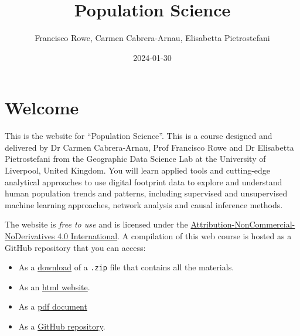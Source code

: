\documentclass[
  letterpaper,
  DIV=11,
  numbers=noendperiod]{scrreprt}
\title{Population Science}
\author{Francisco Rowe, Carmen Cabrera-Arnau, Elisabetta Pietrostefani}
\date{2024-01-30}
\providecommand{\tightlist}{%
  \setlength{\itemsep}{0pt}\setlength{\parskip}{0pt}}\usepackage{longtable,booktabs,array}
\renewcommand*\contentsname{Table of contents}
\newcommand\contentsname{Table of contents}
\begin{document}
\maketitle
\ifdefined\Shaded\renewenvironment{Shaded}{\begin{tcolorbox}[borderline west={3pt}{0pt}{shadecolor}, sharp corners, frame hidden, boxrule=0pt, enhanced, breakable, interior hidden]}{\end{tcolorbox}}\fi

\renewcommand*\contentsname{Table of contents}
{
\hypersetup{linkcolor=}
\setcounter{tocdepth}{2}
\tableofcontents
}

\hypertarget{welcome}{%
\chapter*{Welcome}\label{welcome}}


This is the website for ``Population Science''. This is a course
designed and delivered by Dr Carmen Cabrera-Arnau, Prof Francisco Rowe
and Dr Elisabetta Pietrostefani from the Geographic Data Science Lab at
the University of Liverpool, United Kingdom. You will learn applied
tools and cutting-edge analytical approaches to use digital footprint
data to explore and understand human population trends and patterns,
including supervised and unsupervised machine learning approaches,
network analysis and causal inference methods.

The website is \emph{free to use} and is licensed under the
\href{https://creativecommons.org/licenses/by-nc-nd/4.0/}{Attribution-NonCommercial-NoDerivatives
4.0 International}. A compilation of this web course is hosted as a
GitHub repository that you can access:

\begin{itemize}
\tightlist
\item
  As a
  \href{https://github.com/fcorowe/r4ps/archive/refs/heads/main.zip}{download}
  of a \texttt{.zip} file that contains all the materials.
\item
  As an \href{https://www.population-science.net}{html website}.
\item
  As a
  \href{https://www.population-science.net/Population-Science.pdf}{pdf
  document}
\item
  As a \href{https://github.com/fcorowe/r4ps}{GitHub repository}.
\end{itemize}
\end{document}
